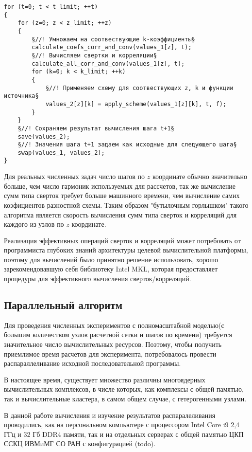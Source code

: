 \begin{lstlisting}[style={CppCodeStyle}]
for (t=0; t < t_limit; ++t)
{
	for (z=0; z < z_limit; ++z)
	{
		§//! Умножаем на соотвествующие k-коэффициенты§
		calculate_coefs_corr_and_conv(values_1[z], t);
		§//! Вычисляем свертки и корреляции§
		calculate_all_corr_and_conv(values_1[z], t);
		for (k=0; k < k_limit; ++k)
		{
			§//! Применяем схему для соотвествующих z, k и функции источника§
			values_2[z][k] = apply_scheme(values_1[z][k], t, f);
		}
	}
	§//! Сохраняем результат вычисления шага t+1§
	save(values_2);
	§//! Значения шага t+1 задаем как исходные для следующего шага§
	swap(values_1, values_2);
}
\end{lstlisting}

Для реальных численных задач число шагов по $z$ координате обычно значительно больше, чем число гармоник используемых для рассчетов,
так же вычисление сумм типа сверток требует больше машинного времени, чем вычисление самих коэфициентов разностной схемы.
Таким образом "бутылочным горлышком" такого алгоритма является скорость вычисления сумм типа сверток и корреляций для
каждого из узлов по $z$ координате.

Реализация эффективных операций сверток и корреляций может потребовать от программиста глубоких знаний архитектуры 
целевой вычислительной платформы, поэтому для вычислений было принятно решение использовать,
хорошо зарекомендовавшую себя библиотеку Intel MKL, которая предоставляет процедуры для эффективного вычисления сверток/корреляций.

\subsection{Параллельный алгоритм}
Для проведения численных экспериментов с полномасштабной моделью(с большим количеством узлов расчетной сетки и шагов по времени)
требуется значительное число вычислительных ресурсов. Поэтому, чтобы получить приемлимое время расчетов для эксперимента,
потребовалось провести распараллеливание исходной последовательной программы.

В настоящее время, существует множество различны многоядерных вычислительных комплексов, в числе которых, как комплексы с общей памятью,
так и вычислительные кластера, в самом общем случае, с гетерогенными узлами.

В данной работе вычисления и изучение результатов распаралеливания проводились, как на персональном компьютере с процессором Intel Core i9 2,4 ГГц и
32 Гб DDR4 памяти, так и на отдельных серверах с общей памятью ЦКП ССКЦ ИВМиМГ СО РАН с конфигурацией (todo).

